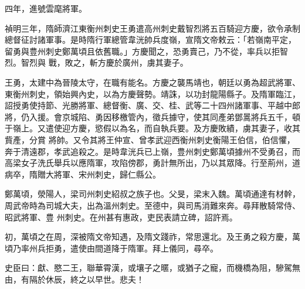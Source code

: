 \begin{pinyinscope}
 四年，進號雲麾將軍。



 禎明三年，隋師濟江東衡州刺史王勇遣高州刺史戴智烈將五百騎迎方慶，欲令承制總督征討諸軍事。是時隋行軍總管韋洸帥兵度嶺，宣隋文帝敕云：「若嶺南平定，留勇與豊州刺史鄭萬頃且依舊職。」方慶聞之，恐勇賣己，乃不從，率兵以拒智烈。智烈與
 戰，敗之，斬方慶於廣州，虜其妻子。



 王勇，太建中為晉陵太守，在職有能名。方慶之襲馬靖也，朝廷以勇為超武將軍、東衡州刺史，領始興內史，以為方慶聲勢。靖誅，以功封龍陽縣子。及隋軍臨江，詔授勇使持節、光勝將軍、總督衡、廣、交、桂、武等二十四州諸軍事、平越中郎將，仍入援。會京城陷、勇因移檄管內，徵兵據守，使其同產弟鄧暠將兵五千，頓于嶺上。又遣使迎方慶，慾假以為名，而自執兵要。及方慶敗績，虜其妻子，收其貲產，分賞
 將帥。又令其將王仲宣、曾孝武迎西衡州刺史衡陽王伯信，伯信懼，奔于清遠郡，孝武追殺之。是時韋洸兵已上嶺，豊州刺史鄭萬頃據州不受勇召，而高梁女子洗氏舉兵以應隋軍，攻陷傍郡，勇計無所出，乃以其眾降。行至荊州，道病卒，隋贈大將軍、宋州刺史，歸仁縣公。



 鄭萬頃，滎陽人，梁司州刺史紹叔之族子也。父旻，梁末入魏。萬頃通達有材幹，周武帝時為司城大夫，出為溫州刺史。至德中，與司馬消難來奔。尋拜散騎常侍、昭武將軍、豊
 州刺史。在州甚有惠政，吏民表請立碑，詔許焉。



 初，萬頃之在周，深被隋文帝知遇，及隋文踐祚，常思還北。及王勇之殺方慶，萬頃乃率州兵拒勇，遣使由間道降于隋軍。拜上儀同，尋卒。



 史臣曰：獻、愍二王，聯華霄漢，或壤子之暱，或猶子之寵，而機橋為阻，驂駕無由，有隔於休辰，終之以早世。悲夫！



\end{pinyinscope}